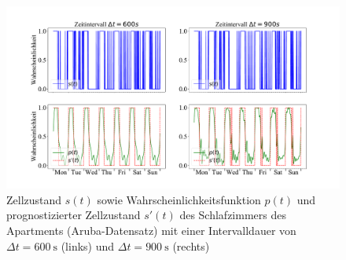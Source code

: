 \begin{figure}[!h]
		\includegraphics[width=\linewidth]{Abbildungen/evaluation/bin_size_influence_master_bedroom_binary.pdf}
		\caption[Zellzustand $s(t)$ sowie Wahrscheinlichkeitsfunktion $p(t)$ und prognostizierter Zellzustand $s'(t)$ des Schlafzimmers des Apartments mit einer Intervalldauer von $\Delta t = \SI{600}{\second}$ und $\Delta t = \SI{900}{\second}$]{Zellzustand $s(t)$ sowie Wahrscheinlichkeitsfunktion $p(t)$ und prognostizierter Zellzustand $s'(t)$ des Schlafzimmers des Apartments (Aruba-Datensatz) mit einer Intervalldauer von $\Delta t = \SI{600}{\second}$ (links) und $\Delta t = \SI{900}{\second}$ (rechts)}
		\label{fig.bin_size_influence_master_bedroom_binary}
\end{figure}

